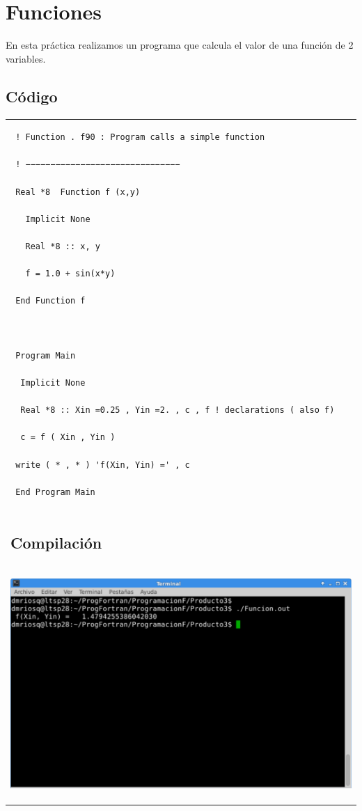 \documentclass[10pt]{article}
\begin{document}
\section{Funciones}
En esta práctica realizamos un programa que calcula el valor de una función de 2 variables.

\subsection{Código}
\begin{tabular}{l}
\begin{verbatim}  
 ! Function . f90 : Program calls a simple function

 ! −−−−−−−−−−−−−−−−−−−−−−−−−−−−−−−

 Real *8  Function f (x,y)

   Implicit None

   Real *8 :: x, y

   f = 1.0 + sin(x*y)

 End Function f



 Program Main

  Implicit None

  Real *8 :: Xin =0.25 , Yin =2. , c , f ! declarations ( also f)

  c = f ( Xin , Yin )

 write ( * , * ) 'f(Xin, Yin) =' , c

 End Program Main 
\end{verbatim} \\
\subsection{Compilación}\\

\begin{center}
   \includegraphics[scale=0.4]{F}
\end{center}
\end{tabular}
\end{document}
